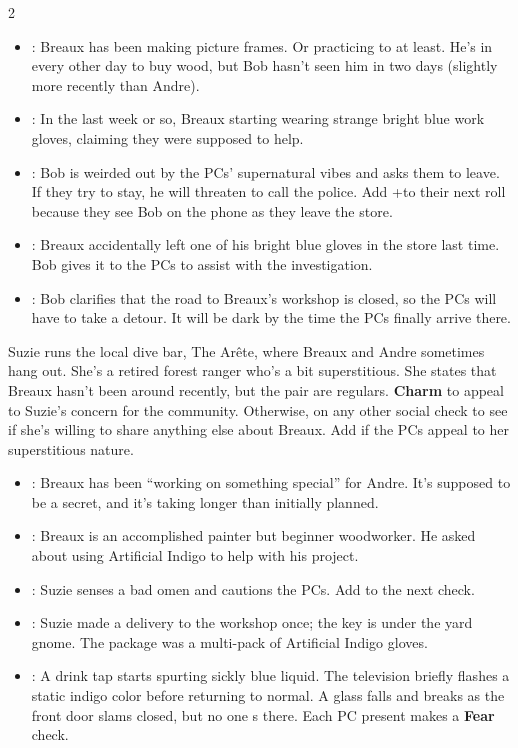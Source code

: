 \documentclass{book}
\newcommand{\df}{\DifficultyDie }
\newcommand{\stb}{\SetbackDie }
\newcommand{\ch}{\ChallengeDie }
\newcommand{\bbb}{\BoostDie }
\newcommand{\ai}{{\color{cyan}Artificial Indigo}\xspace}
\begin{document}
\begin{multicols*}{2}
\vspace{-1em}
\begin{itemize}
\setlength\itemsep{-.5em}
    \item \Success: Breaux has been making picture frames.  Or practicing to at least.  He's in every other day to buy wood, but Bob hasn't seen him in two days (slightly more recently than Andre).
    \item \Advantage\Advantage:  In the last week or so, Breaux starting wearing strange bright blue work gloves, claiming they were supposed to help.
    \item \Threat\Threat: Bob is weirded out by the PCs' supernatural vibes and asks them to leave.  If they try to stay, he will threaten to call the police.  Add +\stb to their next roll because they see Bob on the phone as they leave the store.
    \item \Triumph: Breaux accidentally left one of his bright blue gloves in the store last time.  Bob gives it to the PCs to assist with the investigation.
    \item \Despair: Bob clarifies that the road to Breaux's workshop is closed, so the PCs will have to take a detour.  It will be dark by the time the PCs finally arrive there.
\end{itemize}

\vspace{-2em}
Suzie runs the local dive bar, The Ar\^ete, where Breaux and Andre sometimes hang out.  She's a retired forest ranger who's a bit superstitious.  She states that Breaux hasn't been around recently, but the pair are regulars.  \ch\df\bbb \textbf{Charm} to appeal to Suzie's concern for the community.  Otherwise, \df\df\df on any other social check to see if she's willing to share anything else about Breaux.  Add \bbb if the PCs appeal to her superstitious nature.

\vspace{-2em}
\begin{itemize}
\setlength\itemsep{-.5em}
    \item \Success: Breaux has been ``working on something special'' for Andre.  It's supposed to be a secret, and it's taking longer than initially planned.
    \item \Advantage\Advantage: Breaux is an accomplished painter but beginner woodworker.  He asked about using \ai to help with his project.
    \item \Threat\Threat: Suzie senses a bad omen and cautions the PCs.  Add \stb to the next check.  
    \item \Triumph:  Suzie made a delivery to the workshop once; the key is under the yard gnome.  The package was a multi-pack of \ai gloves.
    \item \Despair:  A drink tap starts spurting sickly blue liquid.  The television briefly flashes a static indigo color before returning to normal.  A glass falls and breaks as the front door slams closed, but no one s there.  Each PC present makes a \df\df \textbf{Fear} check.
\end{itemize}


\end{multicols*}
\end{document}
